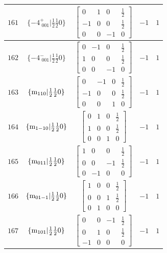 \documentclass[fleqn,8pt]{jsarticle}
\begin{document}
\begin{longtable}{ccccc}
$ 161 $ & $ \{-4^{+}_{\,\,001}|\frac{1}{2} \frac{1}{2} 0\} $ & $ \begin{bmatrix} 0 & 1 & 0 & \frac{1}{2} \\ -1 & 0 & 0 & \frac{1}{2} \\ 0 & 0 & -1 & 0 \end{bmatrix} $ & $ -1 $ & $ 1 $ \\ \hline
$ 162 $ & $ \{-4^{-}_{\,\,001}|\frac{1}{2} \frac{1}{2} 0\} $ & $ \begin{bmatrix} 0 & -1 & 0 & \frac{1}{2} \\ 1 & 0 & 0 & \frac{1}{2} \\ 0 & 0 & -1 & 0 \end{bmatrix} $ & $ -1 $ & $ 1 $ \\ \hline
$ 163 $ & $ \{{\rm m}_{110}|\frac{1}{2} \frac{1}{2} 0\} $ & $ \begin{bmatrix} 0 & -1 & 0 & \frac{1}{2} \\ -1 & 0 & 0 & \frac{1}{2} \\ 0 & 0 & 1 & 0 \end{bmatrix} $ & $ -1 $ & $ 1 $ \\ \hline
$ 164 $ & $ \{{\rm m}_{1-10}|\frac{1}{2} \frac{1}{2} 0\} $ & $ \begin{bmatrix} 0 & 1 & 0 & \frac{1}{2} \\ 1 & 0 & 0 & \frac{1}{2} \\ 0 & 0 & 1 & 0 \end{bmatrix} $ & $ -1 $ & $ 1 $ \\ \hline
$ 165 $ & $ \{{\rm m}_{011}|\frac{1}{2} \frac{1}{2} 0\} $ & $ \begin{bmatrix} 1 & 0 & 0 & \frac{1}{2} \\ 0 & 0 & -1 & \frac{1}{2} \\ 0 & -1 & 0 & 0 \end{bmatrix} $ & $ -1 $ & $ 1 $ \\ \hline
$ 166 $ & $ \{{\rm m}_{01-1}|\frac{1}{2} \frac{1}{2} 0\} $ & $ \begin{bmatrix} 1 & 0 & 0 & \frac{1}{2} \\ 0 & 0 & 1 & \frac{1}{2} \\ 0 & 1 & 0 & 0 \end{bmatrix} $ & $ -1 $ & $ 1 $ \\ \hline
$ 167 $ & $ \{{\rm m}_{101}|\frac{1}{2} \frac{1}{2} 0\} $ & $ \begin{bmatrix} 0 & 0 & -1 & \frac{1}{2} \\ 0 & 1 & 0 & \frac{1}{2} \\ -1 & 0 & 0 & 0 \end{bmatrix} $ & $ -1 $ & $ 1 $ \\ \hline

\end{longtable}
\end{document}
